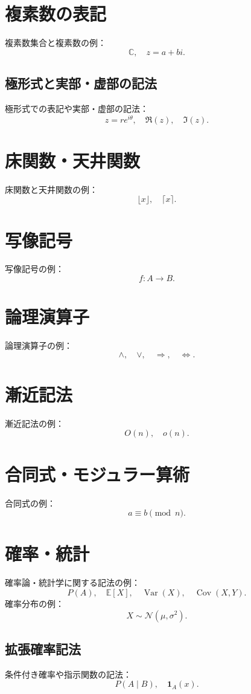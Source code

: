 \documentclass{ltjsarticle} %
\begin{document}
\section{複素数の表記}
複素数集合と複素数の例：
\[
  \mathbb{C}, \quad z = a + bi.
\]
\subsection{極形式と実部・虚部の記法}
極形式での表記や実部・虚部の記法：
\[
  z = re^{i\theta},\quad \Re(z),\quad \Im(z).
\]

\section{床関数・天井関数}
床関数と天井関数の例：
\[
  \lfloor x \rfloor, \quad \lceil x \rceil.
\]

\section{写像記号}
写像記号の例：
\[
  f: A \to B.
\]

\section{論理演算子}
論理演算子の例：
\[
  \land,\quad \lor,\quad \Rightarrow,\quad \Leftrightarrow.
\]

\section{漸近記法}
漸近記法の例：
\[
  O(n), \quad o(n).
\]

\section{合同式・モジュラー算術}
合同式の例：
\[
  a \equiv b \pmod{n}.
\]

\section{確率・統計}
確率論・統計学に関する記法の例：
\[
  P(A), \quad \mathbb{E}[X], \quad \operatorname{Var}(X), \quad \operatorname{Cov}(X,Y).
\]
確率分布の例：
\[
  X \sim \mathcal{N}(\mu, \sigma^2).
\]
\subsection{拡張確率記法}
条件付き確率や指示関数の記法：
\[
  P(A \mid B),\quad \mathbf{1}_A(x).
\]
\end{document}
